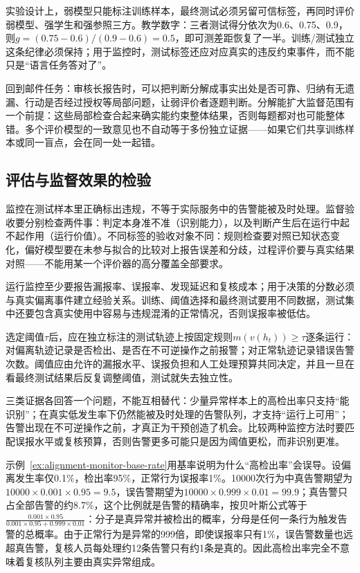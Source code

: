 实验设计上，弱模型只能标注训练样本，最终测试必须另留可信标签，再同时评价弱模型、强学生和强参照三方。教学数字：三者测试得分依次为0.6、0.75、0.9，则$g=(0.75-0.6)/(0.9-0.6)=0.5$，即可测差距恢复了一半。训练/测试独立这条纪律必须保持；用于监控时，测试标签还应对应真实的违反约束事件，而不能只是“语言任务答对了”。

回到邮件任务：审核长报告时，可以把判断分解成事实出处是否可靠、归纳有无遗漏、行动是否经过授权等局部问题，让弱评价者逐题判断。分解能扩大监督范围有一个前提：这些局部检查合起来确实能约束整体结果，否则每题都对也可能整体错。多个评价模型的一致意见也不自动等于多份独立证据——如果它们共享训练样本或同一盲点，会在同一处一起错。

\subsection{评估与监督效果的检验}
\label{sec:alignment-oversight-validation}

监控在测试样本里正确标出违规，不等于实际服务中的告警能被及时处理。监督验收要分别检查两件事：判定本身准不准（识别能力），以及判断产生后在运行中起不起作用（运行价值）。不同标签的验收对象不同：规则检查要对照已知状态变化，偏好模型要在未参与拟合的比较对上报告误差和分歧，过程评价要与真实结果对照——不能用某一个评价器的高分覆盖全部要求。

运行监控至少要报告漏报率、误报率、发现延迟和复核成本；用于决策的分数必须与真实偏离事件建立经验关系。训练、阈值选择和最终测试要用不同数据，测试集中还要包含真实使用中容易与违规混淆的正常情况，否则误报率被低估。

选定阈值$\tau$后，应在独立标注的测试轨迹上按固定规则$m(v(h_t))\geq\tau$逐条运行：对偏离轨迹记录是否检出、是否在不可逆操作之前报警；对正常轨迹记录错误告警次数。阈值应由允许的漏报水平、误报负担和人工处理预算共同决定，并且一旦在看最终测试结果后反复调整阈值，测试就失去独立性。

三类证据各回答一个问题，不能互相替代：少量异常样本上的高检出率只支持“能识别”；在真实低发生率下仍然能被及时处理的告警队列，才支持“运行上可用”；告警出现在不可逆操作之前，才真正为干预创造了机会。比较两种监控方法时要匹配误报水平或复核预算，否则告警更多可能只是因为阈值更松，而非识别更准。

\begin{example}[低发生率下的告警负担]
\label{ex:alignment-monitor-base-rate}
示例~\ref{ex:alignment-monitor-base-rate}用基率说明为什么“高检出率”会误导。设偏离发生率仅0.1\%，检出率95\%，正常行为误报率1\%。10000次行为中真告警期望为$10000\times0.001\times0.95=9.5$，误告警期望为$10000\times0.999\times0.01=99.9$；真告警只占全部告警的约8.7\%，这个比例就是告警的精确率，按贝叶斯公式等于$\frac{0.001\times0.95}{0.001\times0.95+0.999\times0.01}$：分子是真异常并被检出的概率，分母是任何一条行为触发告警的总概率。由于正常行为是异常的999倍，即使误报率只有1\%，误告警数量也远超真告警，复核人员每处理约12条告警只有约1条是真的。因此高检出率完全不意味着复核队列主要由真实异常组成。
\end{example}

